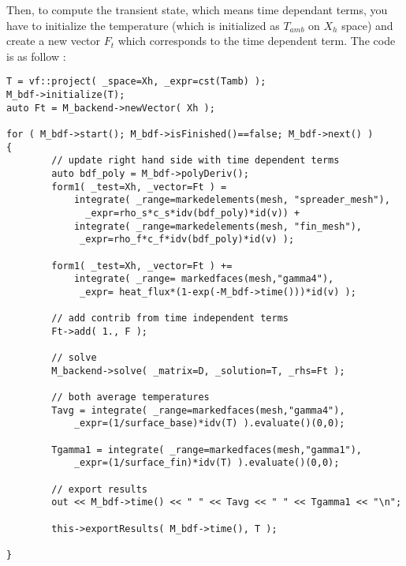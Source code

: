 Then, to compute the transient state, which means time dependant terms, you have to initialize the temperature (which is initialized as $T_{amb}$ on $X_h$ space) and create a new vector  $F_t$ which corresponds to the time dependent term. The code is as follow :
\begin{lstlisting}
T = vf::project( _space=Xh, _expr=cst(Tamb) );
M_bdf->initialize(T);
auto Ft = M_backend->newVector( Xh );

for ( M_bdf->start(); M_bdf->isFinished()==false; M_bdf->next() )
{
        // update right hand side with time dependent terms                                                                                              
        auto bdf_poly = M_bdf->polyDeriv();
        form1( _test=Xh, _vector=Ft ) =
            integrate( _range=markedelements(mesh, "spreader_mesh"), 
			  _expr=rho_s*c_s*idv(bdf_poly)*id(v)) +
            integrate( _range=markedelements(mesh, "fin_mesh"), 
			 _expr=rho_f*c_f*idv(bdf_poly)*id(v) );
			
        form1( _test=Xh, _vector=Ft ) +=
            integrate( _range= markedfaces(mesh,"gamma4"),
			 _expr= heat_flux*(1-exp(-M_bdf->time()))*id(v) );

        // add contrib from time independent terms                                                                                                       
        Ft->add( 1., F );

        // solve 
        M_backend->solve( _matrix=D, _solution=T, _rhs=Ft );

        // both average temperatures
        Tavg = integrate( _range=markedfaces(mesh,"gamma4"), 
			_expr=(1/surface_base)*idv(T) ).evaluate()(0,0);
				
        Tgamma1 = integrate( _range=markedfaces(mesh,"gamma1"), 
			_expr=(1/surface_fin)*idv(T) ).evaluate()(0,0);

        // export results                                                                                                                                
        out << M_bdf->time() << " " << Tavg << " " << Tgamma1 << "\n";

        this->exportResults( M_bdf->time(), T );

}
\end{lstlisting}

